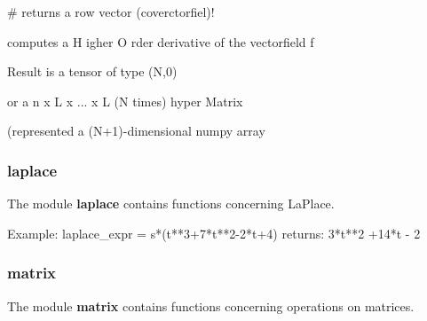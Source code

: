 \documentclass[letterpaper,10pt,english]{sphinxmanual}
\begin{document}

\begin{fulllineitems}
\label{pycontroltools:auxfuncs.math.diffoperators.gradient}
\# returns a row vector (coverctorfiel)!

\end{fulllineitems}


\begin{fulllineitems}
\label{pycontroltools:auxfuncs.math.diffoperators.hoderiv}
computes a H igher O rder derivative of the vectorfield f

Result is a tensor of type (N,0)

or a  n x L x ... x L (N times) hyper Matrix

(represented a (N+1)-dimensional numpy array

\end{fulllineitems}



\subsubsection{\textbf{laplace}}
\label{pycontroltools:laplace}
The module \textbf{laplace} contains functions concerning LaPlace.
\label{pycontroltools:module-auxfuncs.math.laplace}\label{pycontroltools:module-laplace}

\begin{fulllineitems}
\label{pycontroltools:auxfuncs.math.laplace.do_laplace_deriv}
Example:
laplace\_expr = s*(t**3+7*t**2-2*t+4)
returns: 3*t**2  +14*t - 2

\end{fulllineitems}



\subsubsection{\textbf{matrix}}
\label{pycontroltools:matrix}
The module \textbf{matrix} contains functions concerning operations on matrices.
\label{pycontroltools:module-auxfuncs.math.matrix}\label{pycontroltools:module-matrix}
\end{document}
